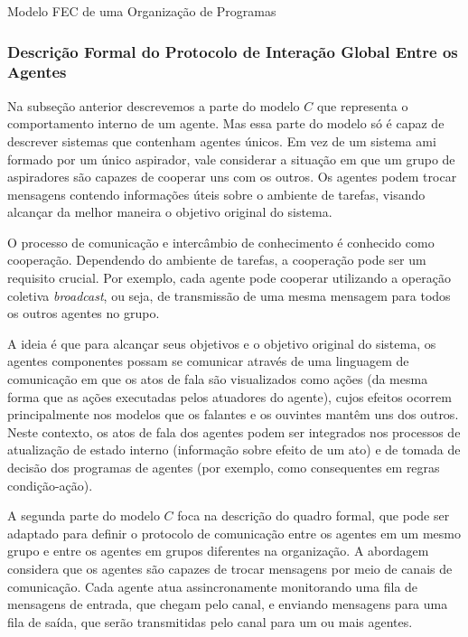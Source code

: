 \begin{section}{Modelo FEC de uma Organização de Programas}
    \subsubsection{Descrição Formal do Protocolo de Interação Global Entre os Agentes}
    
        Na subseção anterior descrevemos a parte do modelo $C$ que representa o comportamento interno de um agente. Mas essa parte do modelo só é capaz de descrever sistemas que contenham agentes únicos. Em vez de um sistema \acrshort{ami} formado por um único aspirador, vale considerar a situação em que um grupo de aspiradores são capazes de cooperar uns com os outros. Os agentes podem trocar mensagens contendo informações úteis sobre o ambiente de tarefas, visando alcançar da melhor maneira o objetivo original do sistema. 
        
        O processo de comunicação e intercâmbio de conhecimento é conhecido como cooperação. Dependendo do ambiente de tarefas, a cooperação pode ser um requisito crucial. Por exemplo, cada agente pode cooperar utilizando a operação coletiva \textit{broadcast}, ou seja, de transmissão de uma mesma mensagem para todos os outros agentes no grupo. 
    
        A ideia é que para alcançar seus objetivos e o objetivo original do sistema, os agentes componentes possam se comunicar através de uma linguagem de comunicação em que os atos de fala são visualizados como ações (da mesma forma que as ações executadas pelos atuadores do agente), cujos efeitos ocorrem principalmente nos modelos que os falantes e os ouvintes mantêm uns dos outros. Neste contexto, os atos de fala dos agentes podem ser integrados nos processos de atualização de estado interno (informação sobre efeito de um ato) e de tomada de decisão dos programas de agentes (por exemplo, como consequentes em regras condição-ação). 
        
        A segunda parte do modelo $C$ foca na descrição do quadro formal, que pode ser adaptado para definir o protocolo de comunicação entre os agentes em um mesmo grupo e entre os agentes em grupos diferentes na organização. A abordagem considera que os agentes são capazes de trocar mensagens por meio de canais de comunicação. Cada agente atua assincronamente monitorando uma fila de mensagens de entrada, que chegam pelo canal, e enviando mensagens para uma fila de saída, que serão transmitidas pelo canal para um ou mais agentes.
        

\end{section}

